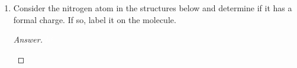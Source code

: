 \documentclass[../psets.tex]{subfiles}
\begin{document}
\begin{enumerate}
\begin{enumerate}
\begin{proof}[Answer]
            ${\color{white}hi}$
            \begin{figure}[H]
                \centering
                \small
                \begin{subfigure}[b]{0.19\linewidth}
                    \centering
                \end{subfigure}
                \begin{subfigure}[b]{0.19\linewidth}
                    \centering
                \end{subfigure}
                \begin{subfigure}[b]{0.19\linewidth}
                    \centering
                \end{subfigure}
                \begin{subfigure}[b]{0.19\linewidth}
                    \centering
                \end{subfigure}
                \begin{subfigure}[b]{0.19\linewidth}
                    \centering
                \end{subfigure}
            \end{figure}
        \end{proof}
        \item Consider the nitrogen atom in the structures below and determine if it has a formal charge. If so, label it on the molecule.
        \begin{proof}[Answer]
            ${\color{white}hi}$
            \begin{figure}[H]
                \centering
                \small
                \begin{subfigure}[b]{0.19\linewidth}
                    \centering
                \end{subfigure}
                \begin{subfigure}[b]{0.19\linewidth}
                    \centering

\end{subfigure}
\end{figure}
\end{proof}
\end{enumerate}
\end{enumerate}
\end{document}
